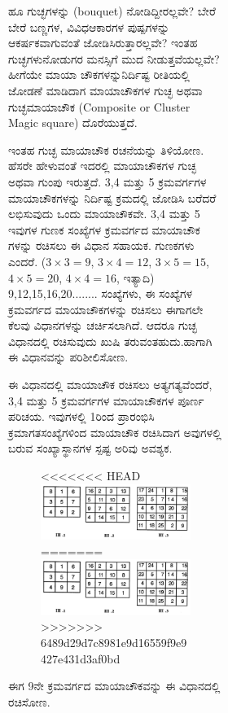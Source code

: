 \begin{figure}[H]
\begin{figure}[H]
\begin{figure}[h]
ಹೂ ಗುಚ್ಛಗಳನ್ನು (bouquet) ನೋಡಿದ್ದೀರಲ್ಲವೇ? ಬೇರೆ ಬೇರೆ ಬಣ್ಣಗಳ, ವಿವಿಧ\break ಆಕಾರಗಳ ಪುಷ್ಪಗಳನ್ನು ಆಕರ್ಷಕವಾಗುವಂತೆ ಜೋಡಿಸಿರುತ್ತಾರಲ್ಲವೇ? ಇಂತಹ ಗುಚ್ಛಗಳು\break ನೋಡುಗರ ಮನಸ್ಸಿಗೆ ಮುದ ನೀಡುತ್ತವೆಯಲ್ಲವೇ? ಹೀಗೆಯೇ ಮಾಯಾ ಚೌಕ\-ಗಳನ್ನು\break ನಿರ್ದಿಷ್ಟ ರೀತಿಯಲ್ಲಿ ಜೋಡಣೆ ಮಾಡಿದಾಗ ಮಾಯಾಚೌಕಗಳ ಗುಚ್ಛ ಅಥವಾ ಗುಚ್ಛ\break ಮಾಯಾಚೌಕ (Composite or Cluster Magic square) ದೊರೆಯುತ್ತದೆ.

ಇಂತಹ ಗುಚ್ಛ ಮಾಯಾಚೌಕ ರಚನೆಯನ್ನು ತಿಳಿಯೋಣ. ಹೆಸರೇ ಹೇಳುವಂತೆ ಇದರಲ್ಲಿ ಮಾಯಾಚೌಕಗಳ ಗುಚ್ಛ ಅಥವಾ ಗುಂಪು ಇರುತ್ತದೆ. 3,4 ಮತ್ತು 5 ಕ್ರಮವರ್ಗಗಳ ಮಾಯಾಚೌಕಗಳನ್ನು ನಿರ್ದಿಷ್ಟ ಕ್ರಮದಲ್ಲಿ ಜೋಡಿಸಿ ಬರೆದರೆ ಲಭಿಸುವುದು ಒಂದು ಮಾಯಾಚೌಕವೇ. 3,4 ಮತ್ತು 5 ಇವುಗಳ ಗುಣಕ ಸಂಖ್ಯೆಗಳ ಕ್ರಮವರ್ಗದ ಮಾಯಾಚೌಕ ಗಳನ್ನು ರಚಿಸಲು ಈ ವಿಧಾನ ಸಹಾಯಕ. ಗುಣಕಗಳು ಎಂದರೆ. ($3 \times 3=9$, $3 \times 4=12$, $3 \times 5=15$, $4 \times 5= 20$, $4 \times 4=16$, ಇತ್ಯಾದಿ) 9,12,15,16,20........ ಸಂಖ್ಯೆಗಳು, ಈ ಸಂಖ್ಯೆಗಳ ಕ್ರಮವರ್ಗದ ಮಾಯಾಚೌಕಗಳನ್ನು ರಚಿಸಲು ಈಗಾಗಲೇ ಕೆಲವು ವಿಧಾನ\-ಗಳನ್ನು ಚರ್ಚಿಸಲಾಗಿದೆ. ಆದರೂ ಗುಚ್ಛ ವಿಧಾನದಲ್ಲಿ ರಚಿಸುವುದು ಖುಷಿ ತರುವಂತಹುದು.\break ಹಾಗಾಗಿ ಈ ವಿಧಾನವನ್ನು ಪರಿಶೀಲಿಸೋಣ.

ಈ ವಿಧಾನದಲ್ಲಿ ಮಾಯಾಚೌಕ ರಚಿಸಲು ಅತ್ಯಗತ್ಯವೆಂದರೆ, 3,4 ಮತ್ತು 5 ಕ್ರಮ\-ವರ್ಗ\-ಗಳ ಮಾಯಾಚೌಕಗಳ ಪೂರ್ಣ ಪರಿಚಯ. ಇವುಗಳಲ್ಲಿ 1ರಿಂದ ಪ್ರಾರಂಭಿಸಿ ಕ್ರಮಾಗತ\break ಸಂಖ್ಯೆಗಳಿಂದ ಮಾಯಾಚೌಕ ರಚಿಸಿದಾಗ ಅವುಗಳಲ್ಲಿ ಬರುವ ಸಂಖ್ಯಾಸ್ಥಾನಗಳ ಸ್ಪಷ್ಟ ಅರಿವು ಅವಶ್ಯಕ.
\begin{figure}[h]
<<<<<<< HEAD
\includegraphics{src/figures/chap3/fig3-30.jpg}
=======
\includegraphics[scale=.75]{src/figures/chap3/fig3.30.jpg}
>>>>>>> 6489d29d7c8981e9d16559f9e9427e431d3af0bd
\end{figure}

ಈಗ 9ನೇ ಕ್ರಮವರ್ಗದ ಮಾಯಾಚೌಕವನ್ನು ಈ ವಿಧಾನದಲ್ಲಿ ರಚಿಸೋಣ.


\end{figure}
\end{figure}
\end{figure}
